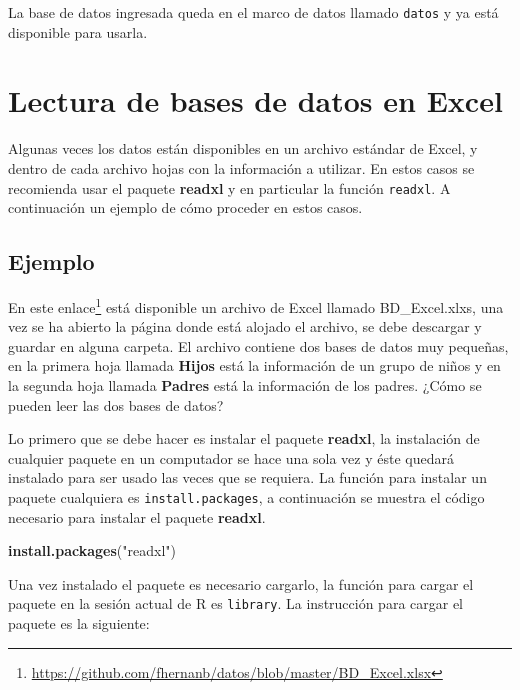 \documentclass[10pt,]{krantz}
\makeatletter
\newenvironment{Shaded}{\begin{snugshade}}{\end{snugshade}}
\newcommand{\KeywordTok}[1]{\textcolor[rgb]{0.13,0.29,0.53}{\textbf{{#1}}}}
\newcommand{\StringTok}[1]{\textcolor[rgb]{0.31,0.60,0.02}{{#1}}}
\newcommand{\NormalTok}[1]{{#1}}
\let\proglang=\textsf
\renewcommand{\href}[2]{#2\footnote{\url{#1}}}
\newenvironment{kframe}{%
\medskip{}
\setlength{\fboxsep}{.8em}
 \def\at@end@of@kframe{}%
 \ifinner\ifhmode%
  \def\at@end@of@kframe{\end{minipage}}%
  \begin{minipage}{\columnwidth}%
 \fi\fi%
 \def\FrameCommand##1{\hskip\@totalleftmargin \hskip-\fboxsep
 \colorbox{shadecolor}{##1}\hskip-\fboxsep
     \hskip-\linewidth \hskip-\@totalleftmargin \hskip\columnwidth}%
 \MakeFramed {\advance\hsize-\width
   \@totalleftmargin\z@ \linewidth\hsize
   \@setminipage}}%
 {\par\unskip\endMakeFramed%
 \at@end@of@kframe}
\renewenvironment{Shaded}{\begin{kframe}}{\end{kframe}}
\makeatother
\begin{document}
La base de datos ingresada queda en el marco de datos llamado
\texttt{datos} y ya está disponible para usarla.

\section{Lectura de bases de datos en
Excel}\label{lectura-de-bases-de-datos-en-excel}

Algunas veces los datos están disponibles en un archivo estándar de
Excel, y dentro de cada archivo hojas con la información a utilizar. En
estos casos se recomienda usar el paquete \textbf{readxl}
\citep{R-readxl} y en particular la función \texttt{readxl}. A
continuación un ejemplo de cómo proceder en estos casos.

\subsection*{Ejemplo}\label{ejemplo-21}


En este
\href{https://github.com/fhernanb/datos/blob/master/BD_Excel.xlsx}{enlace}
está disponible un archivo de Excel llamado BD\_Excel.xlxs, una vez se
ha abierto la página donde está alojado el archivo, se debe descargar y
guardar en alguna carpeta. El archivo contiene dos bases de datos muy
pequeñas, en la primera hoja llamada \textbf{Hijos} está la información
de un grupo de niños y en la segunda hoja llamada \textbf{Padres} está
la información de los padres. ¿Cómo se pueden leer las dos bases de
datos?

Lo primero que se debe hacer es instalar el paquete \textbf{readxl}, la
instalación de cualquier paquete en un computador se hace una sola vez y
éste quedará instalado para ser usado las veces que se requiera. La
función para instalar un paquete cualquiera es
\texttt{install.packages}, a continuación se muestra el código necesario
para instalar el paquete \textbf{readxl}.

\begin{Shaded}
\begin{Highlighting}[]
\KeywordTok{install.packages}\NormalTok{(}\StringTok{"readxl"}\NormalTok{)}
\end{Highlighting}
\end{Shaded}

Una vez instalado el paquete es necesario cargarlo, la función para
cargar el paquete en la sesión actual de \proglang{R} es
\texttt{library}. La instrucción para cargar el paquete es la siguiente:
\end{document}
